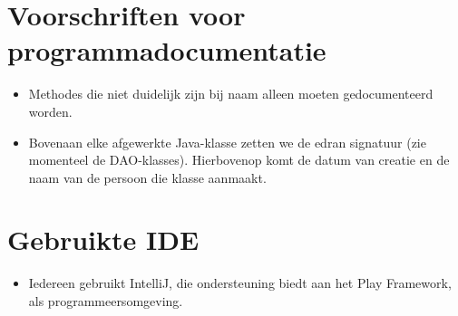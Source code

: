 \documentclass[11pt,a4paper,oneside]{article}
\begin{document}
\section{Voorschriften voor programmadocumentatie}
\begin{itemize}
        \item Methodes die niet duidelijk zijn bij naam alleen moeten gedocumenteerd worden.
        \item Bovenaan elke afgewerkte Java-klasse zetten we de edran signatuur (zie momenteel de DAO-klasses). Hierbovenop komt de datum van creatie en de naam van de persoon die klasse aanmaakt.
\end{itemize}
 
\section{Gebruikte IDE}
\begin{itemize}
        \item Iedereen gebruikt IntelliJ, die ondersteuning biedt aan het Play Framework, als programmeersomgeving.
\end{itemize}
\end{document}
